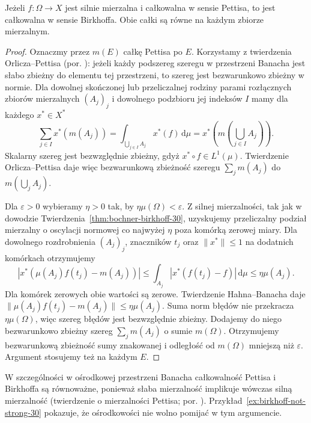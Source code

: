 \begin{twierdzenie}
\label{thm:birkhoff-strong-pettis-30}
Jeżeli $f:\Omega\to X$ jest silnie mierzalna
i całkowalna w sensie Pettisa, to jest całkowalna
w sensie Birkhoffa. Obie całki są równe na każdym
zbiorze mierzalnym.
\end{twierdzenie}
\begin{proof}
Oznaczmy przez $m(E)$ całkę Pettisa po $E$.
Korzystamy z twierdzenia Orlicza--Pettisa
(por. ):
jeżeli każdy podszereg szeregu w przestrzeni
Banacha jest słabo zbieżny do elementu tej
przestrzeni, to szereg jest bezwarunkowo zbieżny
w normie. Dla dowolnej skończonej lub przeliczalnej
rodziny parami rozłącznych zbiorów mierzalnych
$(A_j)_j$ i dowolnego podzbioru jej indeksów $I$
mamy dla każdego $x^*\in X^*$
\[
 \sum_{j\in I}x^*(m(A_j))
 =\int_{\bigcup_{j\in I}A_j}x^*(f)\,\mathrm d\mu
 =x^*\left(m\left(\bigcup_{j\in I}A_j\right)\right).
\]
Skalarny szereg jest bezwzględnie zbieżny, gdyż
$x^*\circ f\in L^1(\mu)$. Twierdzenie Orlicza--Pettisa
daje więc bezwarunkową zbieżność szeregu
$\sum_j m(A_j)$ do $m(\bigcup_j A_j)$.

Dla $\varepsilon>0$ wybieramy $\eta>0$ tak, by
$\eta\mu(\Omega)<\varepsilon$.
Z silnej mierzalności, tak jak w dowodzie
Twierdzenia~\ref{thm:bochner-birkhoff-30}, uzyskujemy
przeliczalny podział mierzalny o oscylacji
normowej co najwyżej $\eta$ poza komórką
zerowej miary. Dla dowolnego rozdrobnienia
$(A_j)_j$, znaczników $t_j$ oraz $\|x^*\|\le1$
na dodatnich komórkach otrzymujemy
\[
 |x^*(\mu(A_j)f(t_j)-m(A_j))|
 \le\int_{A_j}|x^*(f(t_j)-f)|\,\mathrm d\mu
 \le\eta\mu(A_j).
\]
Dla komórek zerowych obie wartości są zerowe.
Twierdzenie Hahna--Banacha daje
$\|\mu(A_j)f(t_j)-m(A_j)\|\le\eta\mu(A_j)$.
Suma norm błędów nie przekracza $\eta\mu(\Omega)$,
więc szereg błędów jest bezwzględnie zbieżny.
Dodajemy do niego bezwarunkowo zbieżny szereg
$\sum_jm(A_j)$ o sumie $m(\Omega)$.
Otrzymujemy bezwarunkową zbieżność sumy znakowanej
i odległość od $m(\Omega)$ mniejszą niż $\varepsilon$.
Argument stosujemy też na każdym $E$.
\end{proof}

W szczególności w ośrodkowej przestrzeni Banacha
całkowalność Pettisa i Birkhoffa są równoważne,
ponieważ słaba mierzalność implikuje wówczas silną
mierzalność (twierdzenie o mierzalności Pettisa;
por. ).
Przykład~\ref{ex:birkhoff-not-strong-30} pokazuje,
że ośrodkowości nie wolno pomijać w tym argumencie.

